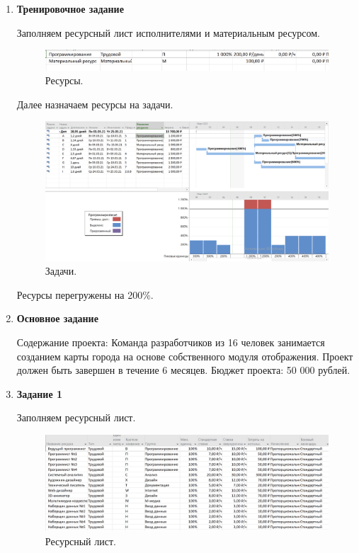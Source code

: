 \documentclass[a4paper,14pt]{extreport} %
\begin{document}
\begin{enumerate}
\item \textbf{Тренировочное задание}

Заполняем ресурсный лист исполнителями и материальным ресурсом.

\begin{figure}[H]
  \centering
  \caption{Ресурсы. }
  \includegraphics[scale=0.6]{dop}
\end{figure}

Далее назначаем ресурсы на задачи.

\begin{figure}[H]
  \centering
  \caption{Задачи. }
  \includegraphics[scale=0.38]{dop1}
\end{figure}

Ресурсы перегружены на 200\%.

\item \textbf{Основное задание}

Содержание проекта: Команда разработчиков из 16 человек занимается созданием карты города на основе собственного модуля отображения. Проект должен быть завершен в течение 6 месяцев. Бюджет проекта: 50 000 рублей.

\item \textbf{Задание 1}

Заполняем ресурсный лист.

\begin{figure}[H]
  \centering
  \caption{Ресурсный лист. }
  \includegraphics[scale=0.5]{list}
\end{figure}


\end{enumerate}
\end{document}
